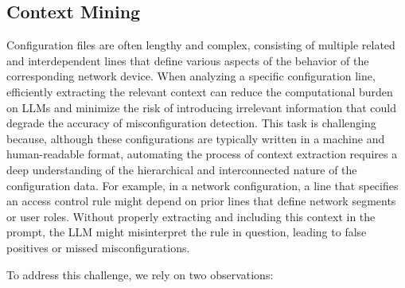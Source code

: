 \subsection{Context Mining}\label{mining_method}  \label{challenge_1} Configuration files
are often lengthy and complex, consisting of multiple related and
interdependent lines that define various aspects of the behavior of the
corresponding network device. When
analyzing a specific configuration line, efficiently
extracting the relevant context can reduce the computational burden on LLMs
and minimize the risk of introducing irrelevant information that could degrade
the accuracy of misconfiguration detection. This task is challenging because,
although these configurations are typically written in a machine and
human-readable format, automating the process of context extraction requires a
deep understanding of the hierarchical and interconnected nature of the
configuration data. For example, in a network configuration, a line that
specifies an access control rule might depend on prior lines that define
network segments or user roles. Without properly extracting and including this
context in the prompt, the LLM might misinterpret the rule in question, leading to false
positives or missed misconfigurations.

To address this challenge, we rely on two observations:

